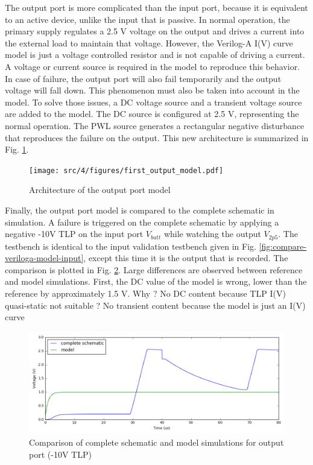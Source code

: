 The output port is more complicated than the input port, because it is equivalent to an active device, unlike the input that is passive.
In normal operation, the primary supply regulates a 2.5 V voltage on the output and drives a current into the external load to maintain that voltage.
However, the Verilog-A I(V) curve model is just a voltage controlled resistor and is not capable of driving a current.
A voltage or current source is required in the model to reproduce this behavior.
In case of failure, the output port will also fail temporarily and the output voltage will fall down.
This phenomenon must also be taken into account in the model.
To solve those issues, a DC voltage source and a transient voltage source are added to the model.
The DC source is configured at 2.5 V, representing the normal operation.
The PWL source generates a rectangular negative disturbance that reproduces the failure on the output.
This new architecture is summarized in Fig. \ref{fig:first-output-model}.

\begin{figure}[!h]
  \centering
  \texttt{[image: src/4/figures/first\_output\_model.pdf]}
  \caption{Architecture of the output port model}
  \label{fig:first-output-model}
\end{figure}

Finally, the output port model is compared to the complete schematic in simulation.
A failure is triggered on the complete schematic by applying a negative -10V TLP on the input port $V_{batt}$ while watching the output $V_{2p5}$.
The testbench is identical to the input validation testbench given in Fig. \ref{fig:compare-veriloga-model-input}, except this time it is the output that is recorded.
The comparison is plotted in Fig. \ref{fig:compare-model-simu-m10-output}.
Large differences are observed between reference and model simulations.
First, the DC value of the model is wrong, lower than the reference by approximately 1.5 V.
Why ?
No DC content because TLP I(V) quasi-static not suitable ?
No transient content because the model is just an I(V) curve

\begin{figure}[!h]
  \centering
  \includegraphics[width=\textwidth]{src/4/figures/comparison_model_total_output_bad_m10V.png}
  \caption{Comparison of complete schematic and model simulations for output port (-10V TLP)}
  \label{fig:compare-model-simu-m10-output}
\end{figure}

